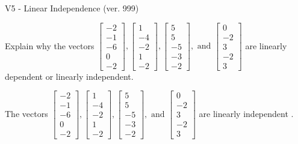 \begin{exercise}
  \begin{exerciseTitle}V5 - Linear Independence (ver. 999)\end{exerciseTitle}
  \begin{exerciseStatement}
    Explain why the vectors \(\left[\begin{array}{r}
-2 \\
-1 \\
-6 \\
0 \\
-2
\end{array}\right] , \left[\begin{array}{r}
1 \\
-4 \\
-2 \\
1 \\
-2
\end{array}\right] , \left[\begin{array}{r}
5 \\
5 \\
-5 \\
-3 \\
-2
\end{array}\right] , \text{ and } \left[\begin{array}{r}
0 \\
-2 \\
3 \\
-2 \\
3
\end{array}\right]\) are linearly dependent or linearly independent.	


  \end{exerciseStatement}
  \begin{exerciseAnswer}
   The vectors \(\left[\begin{array}{r}
-2 \\
-1 \\
-6 \\
0 \\
-2
\end{array}\right] , \left[\begin{array}{r}
1 \\
-4 \\
-2 \\
1 \\
-2
\end{array}\right] , \left[\begin{array}{r}
5 \\
5 \\
-5 \\
-3 \\
-2
\end{array}\right] , \text{ and } \left[\begin{array}{r}
0 \\
-2 \\
3 \\
-2 \\
3
\end{array}\right]\) are 
  	 linearly independent  .
  


  \end{exerciseAnswer}
\end{exercise}